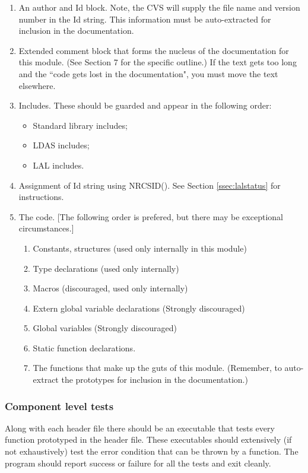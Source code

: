 \documentclass[]{ligodcc}
\begin{document}
\begin{enumerate}
\item
An author and Id block. Note, the CVS will supply the file
name and version number in the Id string. This information must be
auto-extracted for inclusion in the documentation.

\item
Extended comment block that forms the nucleus of the
documentation for this module. (See Section 7 for the specific
outline.) If the text gets too long and the ``code gets lost in the
documentation", you must move the text elsewhere.

\item
Includes. These should be guarded and appear in the following
order:
\begin{itemize}
   \item Standard library includes;
   \item LDAS includes;
   \item LAL includes.
\end{itemize}

\item
Assignment of Id string using NRCSID().  See Section
\ref{ssec:lalstatus} for
instructions.

\item
The code.  [The following order is prefered, but there may be
exceptional circumstances.]

\begin{enumerate}
   \item
   Constants, structures (used only internally in this module)
   \item
   Type declarations (used only internally)
   \item
   Macros (discouraged, used only internally)
   \item
   Extern global variable declarations (Strongly discouraged)
   \item
   Global variables (Strongly discouraged)
   \item
   Static function declarations.
   \item
   The functions that make up the guts of this module.  (Remember, to
   auto-extract the prototypes for inclusion in the documentation.)
\end{enumerate}
\end{enumerate}

\subsubsection{Component level tests}
Along with each header file there should be an executable that tests
every function prototyped in the header file.  These executables
should extensively (if not exhaustively) test the error condition that
can be thrown by a function. The program  should report success or
failure for all the tests and exit cleanly.
\end{document}
